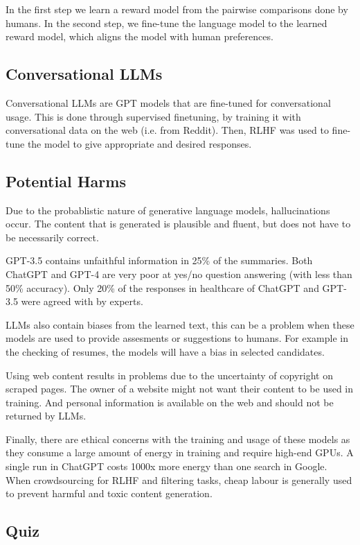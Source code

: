 In the first step we learn a reward model from the pairwise comparisons done
by humans. In the second step, we fine-tune the language model to the
learned reward
model, which aligns the model with human preferences.

\subsection{Conversational LLMs}

Conversational LLMs are GPT models that are fine-tuned for conversational
usage. This is done through supervised finetuning, by training it
with conversational
data on the web (i.e. from Reddit). Then, RLHF was used to fine-tune
the model to give
appropriate and desired responses.

\subsection{Potential Harms}

Due to the probablistic nature of generative language models, hallucinations
occur. The content that is generated is plausible and fluent, but does not have
to be necessarily correct.

GPT-3.5 contains unfaithful information in 25\% of the summaries. Both ChatGPT
and GPT-4 are very poor at yes/no question answering (with less than
50\% accuracy).
Only 20\% of the responses in healthcare of ChatGPT and GPT-3.5 were agreed with
by experts.

LLMs also contain biases from the learned text, this can be a problem
when these models are used to provide assesments or suggestions to humans. For
example in the checking of resumes, the models will have a bias in
selected candidates.

Using web content results in problems due to the uncertainty of copyright
on scraped pages. The owner of a website might not want their content
to be used in
training. And personal information is available on the web and should
not be returned
by LLMs.

Finally, there are ethical concerns with the training and usage of
these models as
they consume a large amount of energy in training and require
high-end GPUs. A single
run in ChatGPT costs 1000x more energy than one search in Google.
When crowdsourcing
for RLHF and filtering tasks, cheap labour is generally used to
prevent harmful and
toxic content generation.

\subsection{Quiz}

